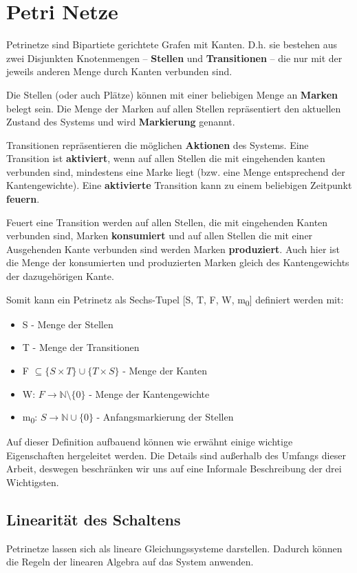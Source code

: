 

\chapter{Petri Netze}
Petrinetze sind Bipartiete gerichtete Grafen mit Kanten.
D.h. sie bestehen aus zwei Disjunkten Knotenmengen -- \textbf{Stellen} und \textbf{Transitionen} -- die nur mit der jeweils anderen Menge durch Kanten verbunden sind.

Die Stellen (oder auch Plätze) können mit einer beliebigen Menge an \textbf{Marken} belegt sein.
Die Menge der Marken auf allen Stellen repräsentiert den aktuellen Zustand des Systems und wird \textbf{Markierung} genannt.

Transitionen repräsentieren die möglichen \textbf{Aktionen} des Systems. 
Eine Transition ist \textbf{aktiviert}, wenn auf allen Stellen die mit eingehenden kanten verbunden sind, mindestens eine Marke liegt (bzw. eine Menge entsprechend der Kantengewichte).
Eine \textbf{aktivierte} Transition kann zu einem beliebigen Zeitpunkt \textbf{feuern}.

Feuert eine Transition werden auf allen Stellen, die mit eingehenden Kanten verbunden sind, Marken \textbf{konsumiert} und auf allen Stellen die mit einer Ausgehenden Kante verbunden sind werden Marken \textbf{produziert}.
Auch hier ist die Menge der konsumierten und produzierten Marken gleich des Kantengewichts der dazugehörigen Kante.

Somit kann ein Petrinetz als Sechs-Tupel [S, T, F, W, m\textsubscript{0}] definiert werden mit:
\begin{itemize}
    \item S - Menge der Stellen
    \item T - Menge der Transitionen
    \item F $\subseteq \{ S \times T \} \cup \{ T \times S \}$ - Menge der Kanten
    \item W: $ F \to \mathbb{N} \setminus \{0\}$ - Menge der Kantengewichte
    \item m\textsubscript{0}: $S \to \mathbb{N} \cup \{0\}$ - Anfangsmarkierung der Stellen
\end{itemize}
Auf dieser Definition aufbauend können wie erwähnt einige wichtige Eigenschaften hergeleitet werden.
Die Details sind außerhalb des Umfangs dieser Arbeit, deswegen beschränken wir uns auf eine Informale Beschreibung der drei Wichtigsten.

\section{Linearität des Schaltens}
Petrinetze lassen sich als lineare Gleichungssysteme darstellen. 
Dadurch können die Regeln der linearen Algebra auf das System anwenden. 


